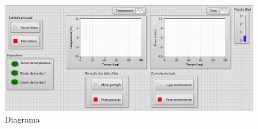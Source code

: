 \begin{figure}[!htb]                                                               
    \centering                                                                      
    \includegraphics[scale=0.6, keepaspectratio=true]{figuras/labview_1.eps} 
    \caption{Diagrama }
 \end{figure}
